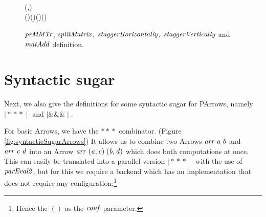 \documentclass[paper=A4,twoside=true,openright,parskip=full,chapterprefix=true,headings=normal,bibliography=totoc,listof=totoc,titlepage=on,captions=tableabove,draft=false,british]{scrreprt}%
\begin{document}
\begin{figure}
\begin{hscode}
\\[\blanklineskip]%
\>[B]{}\mathbin{::}\<[E]%
\\
\>[B]{}\;\;\mathrel{=}\plus {}\;\<[E]%
\\
\>[B]{}\<[5]%
\>[5]{}(,)\mathrel{=}\;\;\<[E]%
\\[\blanklineskip]%
\>[B]{}\mathrel{=}\;(\;)\mathbin{\$}\;(\mathbin{+})\;(\;)\;(\;){}\<[E]%
\ColumnHook
\end{hscode}\resethooks
\caption{\ensuremath{\Varid{prMMTr}}, \ensuremath{\Varid{splitMatrix}}, \ensuremath{\Varid{staggerHorizontally}}, \ensuremath{\Varid{staggerVertically}} and \ensuremath{\Varid{matAdd}} definition.}\label{fig:torus_example_rest}\end{figure}

\hypertarget{syntactic-sugar}{%
\section{Syntactic sugar}\label{syntactic-sugar}}

\label{syntacticSugar}

Next, we also give the definitions for some syntactic sugar for PArrows,
namely \ensuremath{\mathbin{\mid\!\!*\!*\!*\!\!\mid}} and \ensuremath{\mathbin{\mid\!\!\&\!\&\!\&\!\!\mid}}.

For basic Arrows, we have the \ensuremath{\mathbin{*\!*\!*}} combinator. (Figure
\ref{fig:syntacticSugarArrows}) It allows us to combine two Arrows
\ensuremath{\Varid{arr}\;\Varid{a}\;\Varid{b}} and \ensuremath{\Varid{arr}\;\Varid{c}\;\Varid{d}} into an Arrow \ensuremath{\Varid{arr}\;(\Varid{a},\Varid{c})\;(\Varid{b},\Varid{d})} which does
both computations at once. This can easily be translated into a parallel
version \ensuremath{\mathbin{\mid\!\!*\!*\!*\!\!\mid}} with the use of \ensuremath{\Varid{parEval2}}, but for this we require a
backend which has an implementation that does not require any
configuration:\footnote{Hence the \ensuremath{()} as the \ensuremath{\Varid{conf}} parameter.}
\end{document}
